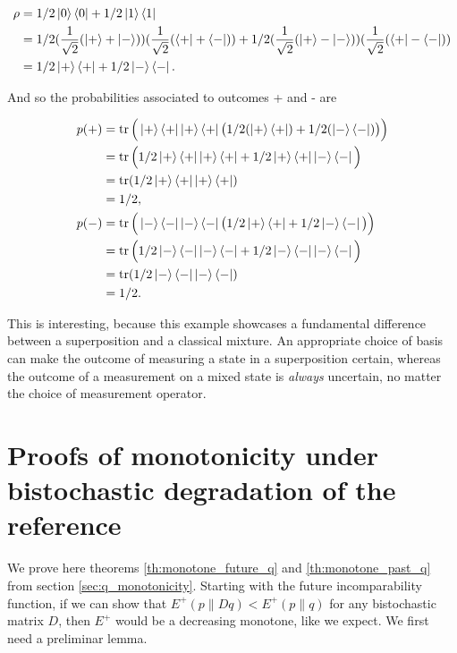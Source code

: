 \begin{align}
    \rho &= 1/2 \ket{0}\bra{0} + 1/2 \ket{1}\bra{1}\\
               &= 1/2 (\frac{1}{\sqrt{2}}(\ket{+} + \ket{-}))(\frac{1}{\sqrt{2}}(\bra{+} + \bra{-})) + 1/2 (\frac{1}{\sqrt{2}}(\ket{+} - \ket{-}))(\frac{1}{\sqrt{2}}(\bra{+} - \bra{-}))\\
               &= 1/2 \ket{+}\bra{+} + 1/2 \ket{-}\bra{-}.
\end{align}

\noindent And so the probabilities associated to outcomes + and - are

\begin{align}
    p(+) &= \operatorname{tr}\Big(\ket{+}\bra{+}\ket{+}\bra{+}\big(1/2 (\ket{+}\bra{+}) + 1/2 (\ket{-}\bra{-})\big)\Big)\\
         &= \operatorname{tr}\Big(1/2 \ket{+}\bra{+}\ket{+}\bra{+} + 1/2 \ket{+}\bra{+}\ket{-}\bra{-}\Big)\\
         &= \operatorname{tr}(1/2 \ket{+}\bra{+}\ket{+}\bra{+})\\
         &= 1/2,\\
    p(-) &= \operatorname{tr}\Big(\ket{-}\bra{-}\ket{-}\bra{-}\big(1/2 \ket{+}\bra{+} + 1/2 \ket{-}\bra{-}\big)\Big)\\
         &= \operatorname{tr}\Big(1/2 \ket{-}\bra{-}\ket{-}\bra{-} + 1/2 \ket{-}\bra{-}\ket{-}\bra{-}\Big)\\
         &= \operatorname{tr}(1/2 \ket{-}\bra{-}\ket{-}\bra{-})\\
         &= 1/2.
\end{align}

This is interesting, because this example showcases a fundamental difference between a superposition and a classical mixture. An appropriate choice of basis can make the outcome of measuring a state in a superposition certain, whereas the outcome of a measurement on a mixed state is \textit{always} uncertain, no matter the choice of measurement operator.



\newpage

\section{Proofs of monotonicity under bistochastic degradation of the reference} \label{app:q_monotonicity}

\setcounter{equation}{0}

We prove here theorems \ref{th:monotone_future_q} and \ref{th:monotone_past_q} from section \ref{sec:q_monotonicity}. Starting with the future incomparability function, if we can show that $E^+(p \parallel Dq) < E^+(p \parallel q)$ for any bistochastic matrix $D$, then $E^+$ would be a decreasing monotone, like we expect. We first need a preliminar lemma.

